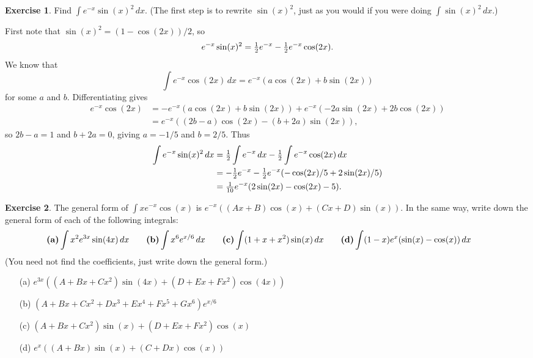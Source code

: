 \documentclass[a4paper]{amsart}
\theoremstyle{definition}
\newtheorem{exercise}{Exercise}[section]
\newenvironment{solution}{{\noindent \bf Solution:}}{}
\begin{document}
\begin{exercise}\label{ex-int-exp-trig-i}
Find $\int e^{-x}\sin(x)^2\,dx$.  (The first step is to
  rewrite $\sin(x)^2$, just as you would if you were doing
  $\int\sin(x)^2\,dx$.)
\end{exercise}
\begin{solution}
  First note that $\sin(x)^2=(1-\cos(2x))/2$, so 
  \[ e^{-x}\sin(x)^2 = \tfrac{1}{2} e^{-x} - \tfrac{1}{2} e^{-x}\cos(2x). \]
  We know that 
  \[ \int e^{-x}\cos(2x)\,dx= e^{-x}(a\cos(2x)+b\sin(2x)) \]
  for some $a$ and $b$.  Differentiating gives
  \begin{align*}
   e^{-x}\cos(2x) &= -e^{-x}(a\cos(2x) + b\sin(2x)) + 
                     e^{-x}(-2a\sin(2x)+2b\cos(2x)) \\
    &= e^{-x}((2b-a)\cos(2x) - (b+2a)\sin(2x)),
  \end{align*}
  so $2b-a=1$ and $b+2a=0$, giving $a=-1/5$ and $b=2/5$.  Thus
  \begin{align*}
   \int e^{-x}\sin(x)^2\, dx &= 
    \tfrac{1}{2} \int e^{-x}\,dx - \tfrac{1}{2} \int e^{-x}\cos(2x)\,dx \\
    &= -\tfrac{1}{2} e^{-x} - \tfrac{1}{2} e^{-x}(-\cos(2x)/5+2\sin(2x)/5) \\
    &= \tfrac{1}{10} e^{-x} (2\sin(2x) - \cos(2x) - 5).
  \end{align*}
\end{solution}
\begin{exercise}\label{ex-int-peo-form}
The general form of $\int xe^{-x}\cos(x)$ is 
 $e^{-x}((Ax+B)\cos(x)+(Cx+D)\sin(x))$.  In the same way,
 write down the general form of each of the following
 integrals:
 \[
  \text{\bf (a)} \int x^2e^{3x}\sin(4x)\,dx \hspace{2em}
  \text{\bf (b)} \int x^6e^{x/6}\,dx \hspace{2em}
  \text{\bf (c)} \int (1+x+x^2)\sin(x)\,dx \hspace{2em}
  \text{\bf (d)} \int (1-x)e^x(\sin(x)-\cos(x))\,dx \hspace{2em}
 \]
 (You need not find the coefficients, just write down the general form.)
\end{exercise}
\begin{solution}
\begin{itemize}
  \item[(a)]
   $e^{3x}((A+Bx+Cx^2)\sin(4x)+(D+Ex+Fx^2)\cos(4x))$
  \item[(b)]
   $(A+Bx+Cx^2+Dx^3+Ex^4+Fx^5+Gx^6)e^{x/6}$
  \item[(c)]
   $(A+Bx+Cx^2)\sin(x) + (D+Ex+Fx^2)\cos(x)$
  \item[(d)]
   $e^x((A+Bx)\sin(x)+(C+Dx)\cos(x))$
 \end{itemize}
\end{solution}
\end{document}
